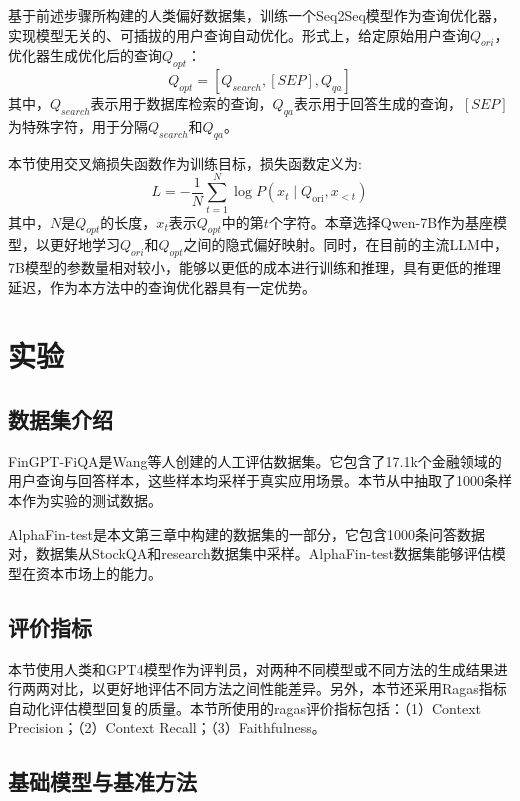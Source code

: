 基于前述步骤所构建的人类偏好数据集，训练一个Seq2Seq模型作为查询优化器，实现模型无关的、可插拔的用户查询自动优化。形式上，给定原始用户查询$Q_{ori}$，优化器生成优化后的查询$Q_{opt}$：
\begin{equation}
	Q_{opt} = [Q_{search}, [SEP], Q_{qa}]
\end{equation}
其中，$Q_{search}$表示用于数据库检索的查询，$Q_{qa}$表示用于回答生成的查询，$[SEP]$为特殊字符，用于分隔$Q_{search}$和$Q_{qa}$。

本节使用交叉熵损失函数作为训练目标，损失函数定义为:
\begin{equation}
	L=-\frac{1}{N} \sum_{t=1}^N \log P\left(x_t \mid Q_{\text{ori}}, x_{<t}\right)
\end{equation}
其中，$N$是$Q_{opt}$的长度，$x_t$表示$Q_{opt}$中的第$t$个字符。本章选择Qwen-7B作为基座模型，以更好地学习$Q_{ori}$和$Q_{opt}$之间的隐式偏好映射。同时，在目前的主流LLM中，7B模型的参数量相对较小，能够以更低的成本进行训练和推理，具有更低的推理延迟，作为本方法中的查询优化器具有一定优势。

\section{实验}

\subsection{数据集介绍}

FinGPT-FiQA\cite{wang2023fingptbenchmark}是Wang等人创建的人工评估数据集。它包含了17.1k个金融领域的用户查询与回答样本，这些样本均采样于真实应用场景。本节从中抽取了1000条样本作为实验的测试数据。

AlphaFin-test是本文第三章中构建的数据集的一部分，它包含1000条问答数据对，数据集从StockQA和research数据集中采样。AlphaFin-test数据集能够评估模型在资本市场上的能力。

\subsection{评价指标}

本节使用人类和GPT4模型作为评判员，对两种不同模型或不同方法的生成结果进行两两对比，以更好地评估不同方法之间性能差异。另外，本节还采用Ragas\cite{DBLP:conf/eacl/ESJAS24}指标自动化评估模型回复的质量。本节所使用的ragas评价指标包括：（1）Context Precision；（2）Context Recall；（3）Faithfulness。

\subsection{基础模型与基准方法}

